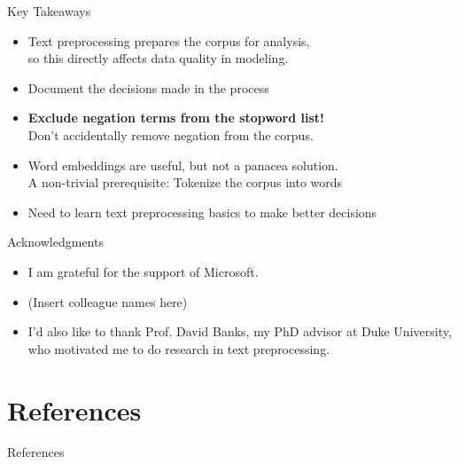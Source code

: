 \documentclass{beamer}
\renewcommand{\cite}{\citep}
\begin{document}




\begin{frame}{Key Takeaways}
\begin{itemize}
\item Text preprocessing prepares the corpus for analysis,\\
	so this directly affects data quality in modeling.
\item Document the decisions made in the process~\cite{nugent2020instead}
	\bigskip
\item \textbf{Exclude negation terms from the stopword list!}\\
	Don't accidentally remove negation from the corpus.
	\bigskip
\item Word embeddings are useful, but not a panacea solution.\\
	A non-trivial prerequisite: Tokenize the corpus into words\\
\item Need to learn text preprocessing basics to make better decisions
\end{itemize}
\end{frame}

\begin{frame}{Acknowledgments}
\begin{itemize}
\item I am grateful for the support of Microsoft.
\item (Insert colleague names here)
	\bigskip
\item I'd also like to thank Prof. David Banks, my PhD advisor at Duke University, who motivated me to do research in text preprocessing.
\end{itemize}
\end{frame}

\section{References}

\begin{frame}[t,allowframebreaks]{References}
\footnotesize


\end{frame}

\end{document}
